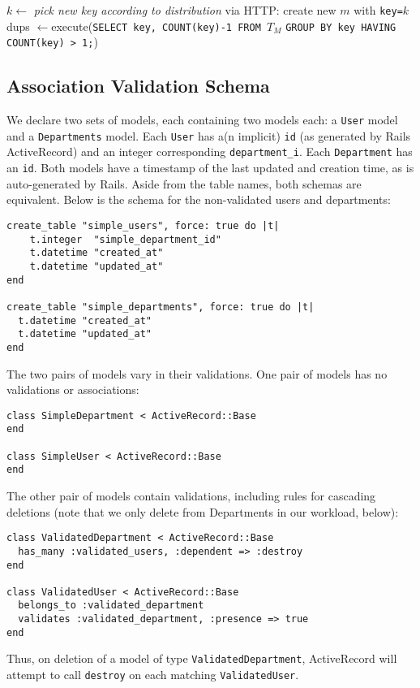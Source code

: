 \begin{algorithm}[H]
\begin{algorithmic}
      \State $k \gets$ \textit{pick new key according to distribution}
      \State via HTTP: create new $m$ with \texttt{key=$k$}
     \EndFor
   \EndParFor
   \State dups $\gets $execute(\texttt{SELECT key, COUNT(key)-1 FROM $T_M$}
   \State \hspace{6.5em}\texttt{GROUP BY key HAVING COUNT(key) > 1;})
\EndFor
\end{algorithmic}
\end{algorithm}

\subsection{Association Validation Schema}
\label{sec:appendix-association-schema}

We declare two sets of models, each containing two models each: a \texttt{User} model and a \texttt{Departments} model. Each \texttt{User} has a(n implicit) \texttt{id} (as generated by Rails ActiveRecord) and an integer corresponding \texttt{department\_i}. Each \texttt{Department} has an \texttt{id}. Both models have a timestamp of the last updated and creation time, as is auto-generated by Rails. Aside from the table names, both schemas are equivalent. Below is the schema for the non-validated users and departments:
\begin{lstlisting}
create_table "simple_users", force: true do |t|
    t.integer  "simple_department_id"
    t.datetime "created_at"
    t.datetime "updated_at"
end

create_table "simple_departments", force: true do |t|
  t.datetime "created_at"
  t.datetime "updated_at"
end
\end{lstlisting}
The two pairs of models vary in their validations. One pair of models has no validations or associations:
\begin{lstlisting}
class SimpleDepartment < ActiveRecord::Base
end

class SimpleUser < ActiveRecord::Base
end
\end{lstlisting}
The other pair of models contain validations, including rules for cascading deletions (note that we only delete from Departments in our workload, below):
\begin{lstlisting}
class ValidatedDepartment < ActiveRecord::Base
  has_many :validated_users, :dependent => :destroy
end

class ValidatedUser < ActiveRecord::Base
  belongs_to :validated_department
  validates :validated_department, :presence => true
end
\end{lstlisting}
Thus, on deletion of a model of type \texttt{ValidatedDepartment}, ActiveRecord will attempt to call \texttt{destroy} on each matching \texttt{ValidatedUser}.


